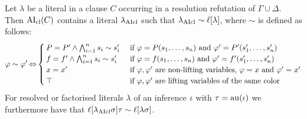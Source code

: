 \documentclass[,%
	draft=false,%
	numbers=noendperiod
	11pt,
	a4paper,
	oneside,%
	openany,
]{memoir}
\begin{document}
\begin{lemma}
	\label{lemma:literals_clause_only_sim}
	Let $\lambda$ be a literal in a clause $C$ occurring in a resolution refutation of $\Gamma\cup\Delta$.
	Then $\operatorname{AI}_\mathrm{cl}(C)$ contains a literal $\lambda_{\operatorname{AIcl}}$ such that $\lambda_{\operatorname{AIcl}} \sim \ell[\lambda]$, where $\sim$ is defined as follows:
	\[
		\varphi \sim \varphi' \operatorname{\Leftrightarrow}
		\begin{cases}
			P = P' \land \bigwedge_{i=1}^n s_i \sim s'_i &  \text{ if $\varphi = P(s_1, \dots, s_n)$ and $\varphi' = P'(s'_1, \dots, s'_n)$} \\
			f = f' \land \bigwedge_{i=1}^n s_i \sim s'_i &  \text{ if $\varphi = f(s_1, \dots, s_n)$ and $\varphi' = f'(s'_1, \dots, s'_n)$} \\
			x = x' & \text{ if $\varphi, \varphi'$ are non-lifting variables, $\varphi = x$ and $\varphi' = x'$} \\
			\top  & \text{ if $\varphi, \varphi'$ are lifting variables of the same color} \\
		\end{cases}
	\]
	For resolved or factorised literals $\lambda$ of an inference $\iota$ with $\tau = \operatorname{au}(\iota)$ we furthermore have that $\ell[\lambda_{\operatorname{AIcl}}\sigma]\tau \sim \ell[\lambda\sigma]$.
\end{lemma}
\end{document}
